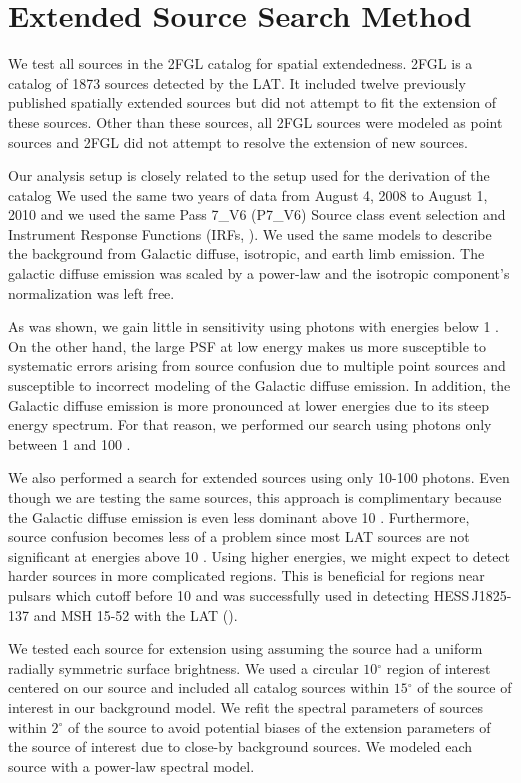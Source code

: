 \documentclass[12pt,preprint]{aastex}
\newcommand{\gev}{\text{GeV}\xspace}
\renewcommand{\deg}{\ensuremath{^\circ}\xspace}
\newcommand{\pointlike}{\text{\em pointlike}\xspace}
\begin{document}
\section{Extended Source Search Method}
\label{extended_source_search_method}

We test all sources in the 2FGL catalog for spatial extendedness.
2FGL is a catalog of 1873 sources detected by the LAT.  It included
twelve previously published spatially extended sources but did not
attempt to fit the extension of these sources. Other than these sources,
all 2FGL sources were modeled as point sources and 2FGL did not attempt
to resolve the extension of new sources.

Our analysis setup is closely related to the setup used for the
derivation of the catalog We used the same two years of data from August
4, 2008 to August 1, 2010 and we used the same Pass 7\_V6 (P7\_V6)
Source class event selection and Instrument Response Functions (IRFs,
\cite{lat_on_orbit_psf}).  We used the same models to describe the
background from Galactic diffuse, isotropic, and earth limb emission.
The galactic diffuse emission was scaled by a power-law and the isotropic
component's normalization was left free.

As was shown, we gain little in sensitivity using photons with energies
below 1 \gev. On the other hand, the large PSF at low energy makes us
more susceptible to systematic errors arising from source confusion due
to multiple point sources and susceptible to incorrect modeling of the
Galactic diffuse emission. In addition, the Galactic diffuse emission
is more pronounced at lower energies due to its steep energy spectrum.
For that reason, we performed our search using photons only between 1
\gev and 100 \gev. 

We also performed a search for extended sources using only 10-100 \gev photons. 
Even though we are testing the same
sources, this approach is complimentary because the Galactic diffuse
emission is even less dominant above 10 \gev. Furthermore, source
confusion becomes less of a problem since most LAT sources are not
significant at energies above 10 \gev.  Using higher energies, we might
expect to detect harder sources in more complicated regions. This is
beneficial for regions near pulsars which cutoff before 10 \gev and was
successfully used in detecting HESS\,J1825-137 and MSH 15-52 with the LAT
(\cite{msh1552,fermi_hess_j1825}).

We tested each source for extension using
\pointlike
assuming the source had a uniform radially symmetric surface brightness.
We used a circular $10\deg$ region of interest centered on our source and
included all catalog sources within $15\deg$ of the source of interest
in our background model.
We refit the spectral parameters of sources within $2\deg$ of the source
to avoid potential biases of the extension parameters of the source of
interest due to close-by background sources.
We modeled each source with a power-law spectral model. 
\end{document}
